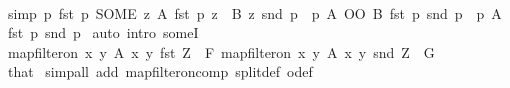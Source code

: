 \begin{isabellebody}
\ \ \ \ \ \ \isamarkupfalse%
\ {\isacharbrackleft}{\kern0pt}simp{\isacharbrackright}{\kern0pt}{\isacharcolon}{\kern0pt}\ {\isachardoublequoteopen}{\isacharparenleft}{\kern0pt}{\isasymlambda}p{\isachardot}{\kern0pt}\ {\isacharparenleft}{\kern0pt}fst\ p{\isacharcomma}{\kern0pt}\ SOME\ z{\isachardot}{\kern0pt}\ A\ {\isacharparenleft}{\kern0pt}fst\ p{\isacharparenright}{\kern0pt}\ z\ {\isasymand}\ B\ z\ {\isacharparenleft}{\kern0pt}snd\ p{\isacharparenright}{\kern0pt}{\isacharparenright}{\kern0pt}{\isacharparenright}{\kern0pt}\ {\isacharbackquote}{\kern0pt}\ {\isacharbraceleft}{\kern0pt}p{\isachardot}{\kern0pt}\ {\isacharparenleft}{\kern0pt}A\ OO\ B{\isacharparenright}{\kern0pt}\ {\isacharparenleft}{\kern0pt}fst\ p{\isacharparenright}{\kern0pt}\ {\isacharparenleft}{\kern0pt}snd\ p{\isacharparenright}{\kern0pt}{\isacharbraceright}{\kern0pt}\ {\isasymsubseteq}\ {\isacharbraceleft}{\kern0pt}p{\isachardot}{\kern0pt}\ A\ {\isacharparenleft}{\kern0pt}fst\ p{\isacharparenright}{\kern0pt}\ {\isacharparenleft}{\kern0pt}snd\ p{\isacharparenright}{\kern0pt}{\isacharbraceright}{\kern0pt}{\isachardoublequoteclose}\ \isamarkupfalse%
{\isacharparenleft}{\kern0pt}auto\ intro{\isacharcolon}{\kern0pt}\ someI{}{\isacharparenright}{\kern0pt}\isanewline
\ \ \ \ \ \ \isamarkupfalse%
\ {\isachardoublequoteopen}map{\isacharunderscore}{\kern0pt}filter{\isacharunderscore}{\kern0pt}on\ {\isacharbraceleft}{\kern0pt}{\isacharparenleft}{\kern0pt}x{\isacharcomma}{\kern0pt}\ y{\isacharparenright}{\kern0pt}{\isachardot}{\kern0pt}\ A\ x\ y{\isacharbraceright}{\kern0pt}\ fst\ {\isacharquery}{\kern0pt}Z\ {\isacharequal}{\kern0pt}\ {\isacharquery}{\kern0pt}F{\isachardoublequoteclose}\ {\isachardoublequoteopen}map{\isacharunderscore}{\kern0pt}filter{\isacharunderscore}{\kern0pt}on\ {\isacharbraceleft}{\kern0pt}{\isacharparenleft}{\kern0pt}x{\isacharcomma}{\kern0pt}\ y{\isacharparenright}{\kern0pt}{\isachardot}{\kern0pt}\ A\ x\ y{\isacharbraceright}{\kern0pt}\ snd\ {\isacharquery}{\kern0pt}Z\ {\isacharequal}{\kern0pt}\ {\isacharquery}{\kern0pt}G{\isachardoublequoteclose}\isanewline
\ \ \ \ \ \ \ \ \isamarkupfalse%
\ that\ \isamarkupfalse%
{\isacharparenleft}{\kern0pt}simp{\isacharunderscore}{\kern0pt}all\ add{\isacharcolon}{\kern0pt}\ map{\isacharunderscore}{\kern0pt}filter{\isacharunderscore}{\kern0pt}on{\isacharunderscore}{\kern0pt}comp\ split{\isacharunderscore}{\kern0pt}def\ o{\isacharunderscore}{\kern0pt}def{\isacharparenright}{\kern0pt}\isanewline
\ \ \ \ \isamarkupfalse%
\isanewline

\end{isabellebody}
